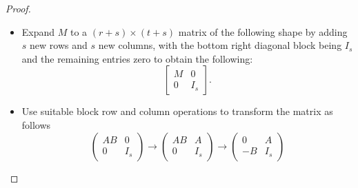 \documentclass[10pt,a4paper]{article}
\begin{document}
\begin{proof}
\begin{itemize}
\item Expand $M$ to a $(r+s) \times (t+s)$ matrix of the following
  shape by adding $s$ new rows and $s$ new columns, with the bottom
  right diagonal block being $I_s$ and the remaining entries zero to
  obtain the following:
\[
\left[
\begin{array}{c|c}
M & 0 \\
\hline
0 & I_s
\end{array}
\right]. 
\]
\item Use suitable block row and column operations to transform the
  matrix as follows
\[
\left(
\begin{array}{cc}
AB & 0 \\
0 & I_s
\end{array}
\right)\rightarrow
\left(
\begin{array}{cc}
AB & A \\
0 & I_s
\end{array}
\right)\rightarrow
\left(
\begin{array}{cc}
0 & A \\
-B & I_s
\end{array}
\right)
\]


\end{itemize}
\end{proof}
\end{document}
